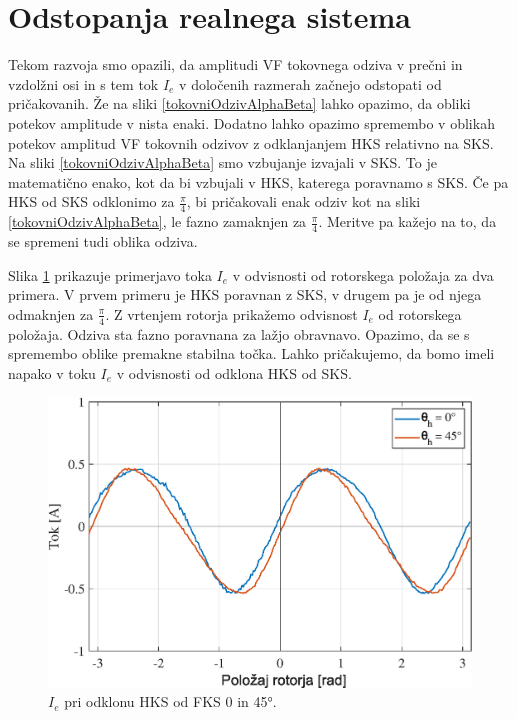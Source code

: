 \documentclass[a4paper,twoside,openright,12pt,slovene]{book}
\begin{document}
\section{Odstopanja realnega sistema}

Tekom razvoja smo opazili, da amplitudi VF tokovnega odziva v prečni in vzdolžni osi in s tem tok $I_e$ v določenih razmerah začnejo odstopati od pričakovanih. Že na sliki \ref{tokovniOdzivAlphaBeta}
lahko opazimo, da obliki potekov amplitude v nista enaki. Dodatno lahko opazimo spremembo v oblikah potekov amplitud VF tokovnih odzivov z odklanjanjem HKS relativno na SKS. Na sliki
\ref{tokovniOdzivAlphaBeta} smo vzbujanje izvajali v SKS. To je matematično enako, kot da bi vzbujali v HKS, katerega poravnamo s SKS. Če pa HKS od SKS odklonimo za $\frac{\pi}{4}$, bi pričakovali
enak odziv kot na sliki \ref{tokovniOdzivAlphaBeta}, le fazno zamaknjen za $\frac{\pi}{4}$. Meritve pa kažejo na to, da se spremeni tudi oblika odziva.

Slika \ref{reguliranaVelicinaIdq0in45} prikazuje primerjavo toka $I_e$ v odvisnosti od rotorskega položaja za dva primera. V prvem primeru je HKS poravnan z SKS, v drugem pa je od njega odmaknjen za
$\frac{\pi}{4}$. Z vrtenjem rotorja prikažemo odvisnost $I_e$ od rotorskega položaja. Odziva sta fazno poravnana za lažjo obravnavo. Opazimo, da se s spremembo oblike premakne stabilna točka. Lahko
pričakujemo, da bomo imeli napako v toku $I_e$ v odvisnosti od odklona HKS od SKS.

\begin{figure}[!htbp]
    \centering
    \includegraphics[width=0.88\columnwidth]{Slike/reguliranaVelicinaIdq0in45.eps}
    \caption{\label{reguliranaVelicinaIdq0in45} $I_e$ pri odklonu HKS od FKS 0 in 45°.}
\end{figure}
\end{document}
